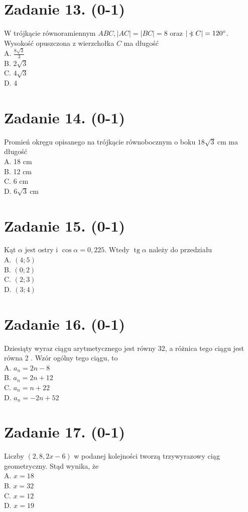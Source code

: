 \documentclass[10pt]{article}
\newcommand\Varangle{\mathop{{<\!\!\!\!\!\text{\small)}}\:}\nolimits}
\begin{document}
\section*{Zadanie 13. (0-1)}
W trójkącie równoramiennym \(A B C,|A C|=|B C|=8\) oraz \(|\Varangle C|=120^{\circ}\). Wysokość opuszczona z wierzchołka \(C\) ma długość\\
A. \(\frac{8 \sqrt{3}}{3}\)\\
B. \(2 \sqrt{3}\)\\
C. \(4 \sqrt{3}\)\\
D. 4

\section*{Zadanie 14. (0-1)}
Promień okręgu opisanego na trójkącie równobocznym o boku \(18 \sqrt{3} \mathrm{~cm}\) ma długość\\
A. 18 cm\\
B. 12 cm\\
C. 6 cm\\
D. \(6 \sqrt{3} \mathrm{~cm}\)

\section*{Zadanie 15. (0-1)}
Kąt \(\alpha\) jest ostry i \(\cos \alpha=0,225\). Wtedy \(\operatorname{tg} \alpha\) należy do przedziału\\
A. \((4 ; 5)\)\\
B. \((0 ; 2)\)\\
C. \((2 ; 3)\)\\
D. \((3 ; 4)\)

\section*{Zadanie 16. (0-1)}
Dziesiąty wyraz ciągu arytmetycznego jest równy 32, a różnica tego ciągu jest równa 2 . Wzór ogólny tego ciągu, to\\
A. \(a_{n}=2 n-8\)\\
B. \(a_{n}=2 n+12\)\\
C. \(a_{n}=n+22\)\\
D. \(a_{n}=-2 n+52\)

\section*{Zadanie 17. (0-1)}
Liczby \((2,8,2 x-6)\) w podanej kolejności tworzą trzywyrazowy ciąg geometryczny. Stąd wynika, że\\
A. \(x=18\)\\
B. \(x=32\)\\
C. \(x=12\)\\
D. \(x=19\)
\end{document}
